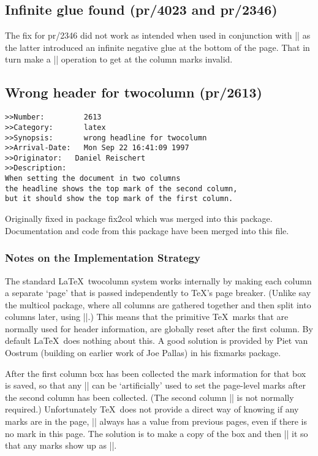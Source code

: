 \documentclass{ltxguide}
\newcommand\Lpack[1]{\mbox{\textsf{#1}}}
\begin{document}
\subsection{Infinite glue found (pr/4023 and pr/2346)}

The fix for pr/2346 did not work as intended when used in conjunction
with |\enlargethispage| as the latter introduced an infinite negative
glue at the bottom of the page. That in turn make a |\vsplit|
operation to get at the column marks invalid.

\subsection{Wrong header for twocolumn (pr/2613)}

\begin{verbatim}
>>Number:         2613
>>Category:       latex
>>Synopsis:       wrong headline for twocolumn
>>Arrival-Date:   Mon Sep 22 16:41:09 1997
>>Originator:   Daniel Reischert
>>Description:
When setting the document in two columns
the headline shows the top mark of the second column,
but it should show the top mark of the first column.
\end{verbatim}

Originally fixed in package \Lpack{fix2col} which was merged into
this package. Documentation and code from this package have been
merged into this file.

\subsubsection{Notes on the Implementation Strategy}

The standard \LaTeX\ twocolumn system works internally by making
each column a separate `page' that is passed independently to \TeX's
page breaker. (Unlike say the \Lpack{multicol} package, where all
columns are gathered together and then split into columns later,
using |\vsplit|.) This means that the primitive \TeX\ marks that are
normally used for header information, are globally reset after the
first column. By default \LaTeX\ does nothing about this.
A good solution is provided by Piet van Oostrum (building on earlier
work of Joe Pallas) in his \Lpack{fixmarks} package.

After the first column box has been collected the mark information
for that box is saved, so that any |\firstmark| can be
`artificially' used to set the page-level marks after the second
column has been collected. (The second column |\firstmark| is not
normally required.) Unfortunately \TeX\ does not provide a direct
way of knowing if any marks are in the page, |\firstmark| always has a
value from previous pages, even if there is no mark in this page.
The solution is to make a copy of the box and then |\vsplit| it
so that any marks show up as |\splitfirstmark|.
\end{document}
